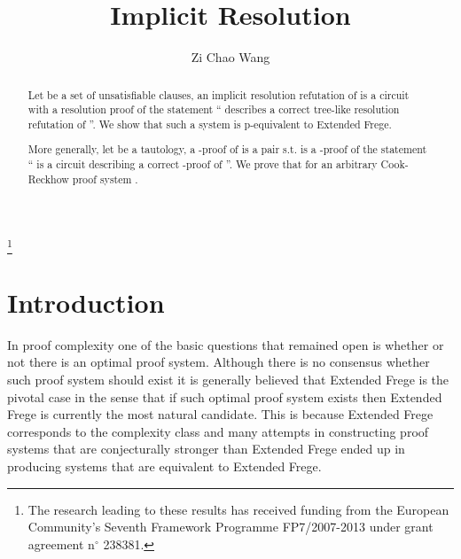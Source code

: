 \documentclass{LMCS}
\theoremstyle{plain}\newtheorem{satz}[thm]{Satz}
\begin{document}
\title[Implicit Resolution]{Implicit Resolution}

\author[Z.~C.~Wang]{Zi Chao Wang}	\address{Department of Algebra\\Faculty of Mathematics and Physics\\Charles University in Prague\\Sokolovsk\' a 83\\Praha 8-Karl\' in\\18675\\Czech Republic}	  \thanks{The research leading to these results has received funding from the European Community's Seventh Framework Programme FP7/2007-2013 under grant agreement n\ensuremath{^\circ} 238381.}	










\begin{abstract}
  Let  be a set of unsatisfiable clauses, an implicit
  resolution refutation of  is a circuit  with a
  resolution proof  of the statement `` describes a
  correct tree-like resolution refutation of ''. We show that
  such a system is p-equivalent to Extended Frege.

  More generally, let  be a tautology, a -proof of
   is a pair  s.t.  is a -proof of
  the statement `` is a circuit describing a correct -proof
  of ''. We prove that  for an arbitrary
  Cook-Reckhow proof system .
\end{abstract}

\maketitle



\section{Introduction}

In proof complexity one of the basic questions that remained open is whether or not there is an optimal proof system. Although there is no consensus whether such proof system should exist it is generally believed that Extended Frege is the pivotal case in the sense that if such optimal proof system exists then Extended Frege is currently the most natural candidate. This is because Extended Frege corresponds to the complexity class  and many attempts in constructing proof systems that are conjecturally stronger than Extended Frege ended up in producing systems that are equivalent to Extended Frege.
\end{document}
